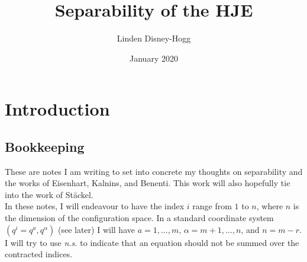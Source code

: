 \documentclass{article}
\title{Separability of the HJE}
\author{Linden Disney-Hogg}
\date{January 2020}
\begin{document}
\maketitle
\tableofcontents

\section{Introduction}
\subsection{Bookkeeping}
These are notes I am writing to set into concrete my thoughts on separability and the works of Eisenhart, Kalnins, and Benenti. This work will also hopefully tie into the work of St\"ackel. \\
In these notes, I will endeavour to have the index $i$ range from $1$ to $n$, where $n$ is the dimension of the configuration space. In a standard coordinate system $(q^i=q^a, q^\alpha)$ (see later) I will have $a=1, \dots, m, \, \alpha = m+1, \dots, n$, and $n=m-r$. I will try to use \textit{n.s.} to indicate that an equation should not be summed over the contracted indices.  
\end{document}

